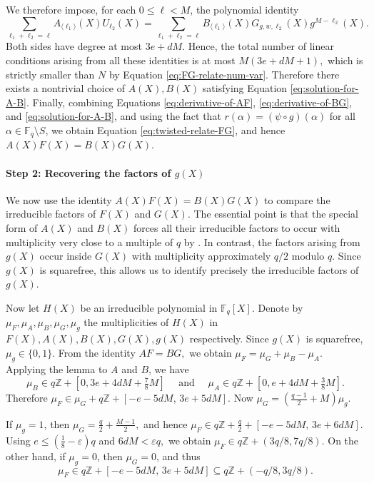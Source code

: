 We therefore impose, for each $0\le \ell<M$, the polynomial identity
\begin{equation}\label{eq:solution-for-A-B}
  \sum_{\ell_1+\ell_2=\ell}
  A_{\langle \ell_1\rangle}(X)
  U_{\ell_2}(X)
  =
  \sum_{\ell_1+\ell_2=\ell}
  B_{\langle \ell_1\rangle}(X)
  G_{g,w,\ell_2}(X)
  g^{M-\ell_2}(X).
\end{equation}
Both sides have degree at most $3e+dM$. Hence, the total number of linear conditions arising from all these identities is at most \(
M(3e+dM+1),
\) which is strictly smaller than $N$ by Equation \eqref{eq:FG-relate-num-var}. Therefore there exists a nontrivial choice of $A(X),B(X)$ satisfying Equation \eqref{eq:solution-for-A-B}. Finally, combining Equations \eqref{eq:derivative-of-AF}, \eqref{eq:derivative-of-BG}, and \eqref{eq:solution-for-A-B}, and using the fact that $r(\alpha)=(\psi\circ g)(\alpha)$ for all $\alpha\in\mathbb F_q\setminus S$, we obtain Equation \eqref{eq:twisted-relate-FG}, and hence $A(X)F(X)=B(X)G(X)$.

\paragraph*{Step 2: Recovering the factors of $g(X)$}

We now use the identity $A(X)F(X)=B(X)G(X)$ to compare the irreducible factors of $F(X)$ and $G(X)$. The essential point is that the special form of $A(X)$ and $B(X)$ forces all their irreducible factors to occur with multiplicity very close to a multiple of $q$ by \PdegMultBoundlem. In contrast, the factors arising from $g(X)$ occur inside $G(X)$ with multiplicity approximately $q/2$ modulo $q$. Since $g(X)$ is squarefree, this allows us to identify precisely the irreducible factors of $g(X)$.

Now let $H(X)$ be an irreducible polynomial in $\mathbb F_q[X]$. Denote by
\(
  \mu_F,\mu_A,\mu_B,\mu_G,\mu_g
\) the multiplicities of $H(X)$ in $F(X),A(X),B(X),G(X),g(X)$ respectively. Since $g(X)$ is squarefree, 
\(
  \mu_g\in\{0,1\}.
\) From the identity
\(
  AF=BG,
\) we obtain
\(
  \mu_F=\mu_G+\mu_B-\mu_A.
\) 
Applying the lemma to $A$ and $B$, we have
\[
  \mu_B\in q\mathbb Z+[0,3e+4dM+\tfrac78 M]\quad\text{ and }\quad
  \mu_A\in q\mathbb Z+[0,e+4dM+\tfrac38 M].
\]
Therefore
\(
  \mu_F
  \in
  \mu_G+q\mathbb Z+[-e-5dM,\,3e+5dM].
\) Now
\(
  \mu_G=\left(\frac{q-1}{2}+M\right)\mu_g.
\) 

If $\mu_g=1$, then
\(
  \mu_G=\frac q2+\frac{M-1}{2},
\)
and hence
\(
  \mu_F
  \in
  q\mathbb Z+\frac q2+[-e-5dM,\,3e+6dM].
\) Using 
\( 
  e\le \left(\frac18-\varepsilon\right)q
\) 
and 
\(
  6dM<\varepsilon q,
\)
we obtain 
\(
  \mu_F\in q\mathbb Z+(3q/8,7q/8).
\) On the other hand, if $\mu_g=0$, then $\mu_G=0$, and thus
\[
  \mu_F
  \in
  q\mathbb Z+[-e-5dM,\,3e+5dM]
  \subseteq
  q\mathbb Z+(-q/8,3q/8).
\]


